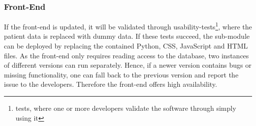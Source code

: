 \subsubsection{Front-End}
If the front-end is updated, it will be validated through usability-tests\footnote{tests, where one or more developers validate the software through simply using it}, where the patient data is replaced with dummy data. 
If these tests succeed, the sub-module can be deployed by replacing the contained Python, CSS, JavaScript and HTML files.
As the front-end only requires reading access to the database, two instances of different versions can run separately. 
Hence, if a newer version contains bugs or missing functionality, one can fall back to the previous version and report the issue to the developers.
Therefore the front-end offers high availability. 






